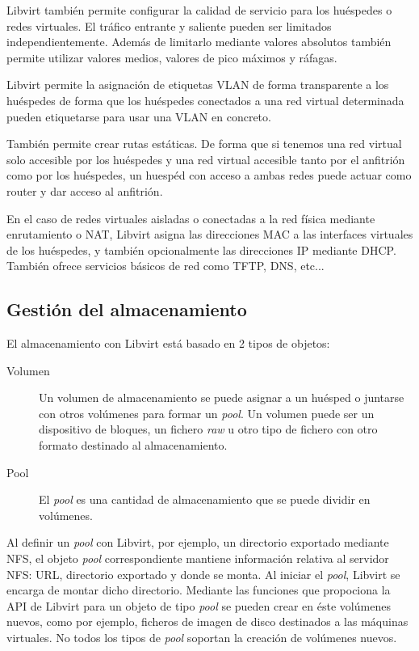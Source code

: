 \documentclass[spanisheDIVcalc,twoside,parskip-,pointlessnumbers,final]{scrbook}
\begin{document}
Libvirt también permite configurar la calidad de servicio para los
huéspedes o redes virtuales. El tráfico entrante y saliente pueden
ser limitados independientemente. Además de limitarlo mediante valores
absolutos también permite utilizar valores medios, valores de pico
máximos y ráfagas.

Libvirt permite la asignación de etiquetas VLAN de forma transparente
a los huéspedes de forma que los huéspedes conectados a una red virtual
determinada pueden etiquetarse para usar una VLAN en concreto.

También permite crear rutas estáticas. De forma que si tenemos una
red virtual solo accesible por los huéspedes y una red virtual accesible
tanto por el anfitrión como por los huéspedes, un huespéd con acceso a
ambas redes puede actuar como router y dar acceso al anfitrión.

En el caso de redes virtuales aisladas o conectadas a la red física
mediante enrutamiento o NAT, Libvirt asigna las direcciones MAC a
las interfaces virtuales de los huéspedes, y también opcionalmente
las direcciones IP mediante DHCP. También ofrece servicios básicos
de red como TFTP, DNS, etc...


\subsection{Gestión del almacenamiento}

El almacenamiento con Libvirt está basado en 2 tipos de objetos:
\begin{description}
\item [{Volumen}] Un volumen de almacenamiento se puede asignar a un huésped
o juntarse con otros volúmenes para formar un \emph{pool}. Un volumen puede
ser un dispositivo de bloques, un fichero \emph{raw} u otro tipo de
fichero con otro formato destinado al almacenamiento.
\item [{Pool}] El \emph{pool} es una cantidad de almacenamiento que se
puede dividir en volúmenes.
\end{description}
Al definir un \emph{pool} con Libvirt, por ejemplo, un directorio
exportado mediante NFS, el objeto \emph{pool} correspondiente mantiene
información relativa al servidor NFS: URL, directorio exportado y
donde se monta. Al iniciar el \emph{pool}, Libvirt se encarga de montar
dicho directorio. Mediante las funciones que propociona la API de
Libvirt para un objeto de tipo \emph{pool} se pueden crear en éste
volúmenes nuevos, como por ejemplo, ficheros de imagen de disco destinados
a las máquinas virtuales. No todos los tipos de \emph{pool} soportan
la creación de volúmenes nuevos. 
\end{document}
